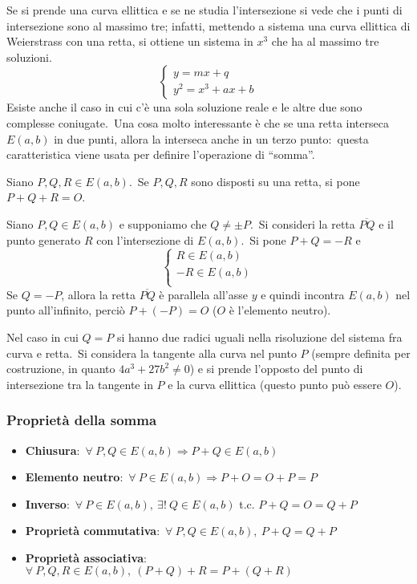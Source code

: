 Se si prende una curva ellittica e se ne studia l'intersezione si vede che i punti di intersezione sono al massimo tre; infatti, mettendo a sistema una curva ellittica di Weierstrass con una retta, si ottiene un sistema in $x^3$ che ha al massimo tre soluzioni.\
\[ \left\{\begin{array}{l}
        y = mx + q \\
        y^2 = x^3 + ax + b
    \end{array}\right.\]
Esiste anche il caso in cui c'è una sola soluzione reale e le altre due sono complesse coniugate.\
Una cosa molto interessante è che se una retta interseca $E(a,b)$ in due punti, allora la interseca anche in un terzo punto:\ questa caratteristica viene usata per definire l'operazione di ``somma''.\

\begin{definition}
    Siano $P, Q, R \in E(a,b)$.\
    Se $P, Q, R$ sono disposti su una retta, si pone $P+Q+R = O$.\
\end{definition}

\noindent Siano $P,Q \in E(a,b)$ e supponiamo che $Q \neq \pm P$.\
Si consideri la retta $\overline{PQ}$ e il punto generato $R$ con l'intersezione di $E(a,b)$.\
Si pone $P+Q = -R$ e
\[\left\{ \begin{array}{l}
        R \in E(a,b)  \\
        -R \in E(a,b) \\
    \end{array}\right.\]
Se $Q = -P$, allora la retta $\overline{PQ}$ è parallela all'asse $y$ e quindi incontra $E(a,b)$ nel punto all'infinito, perciò $P + (-P) = O$ ($O$ è l'elemento neutro).\

Nel caso in cui $Q = P$ si hanno due radici uguali nella risoluzione del sistema fra curva e retta.\
Si considera la tangente alla curva nel punto $P$ (sempre definita per costruzione, in quanto $4a^3 +27b^2 \neq 0$) e si prende l'opposto del punto di intersezione tra la tangente in $P$ e la curva ellittica (questo punto può essere $O$).\

\subsubsection{Proprietà della somma}

\begin{itemize}
    \item \textbf{Chiusura}:\ $\forall\ P,Q \in E(a,b) \Rightarrow P + Q \in E(a,b)$
    \item \textbf{Elemento neutro}:\ $\forall\ P \in E(a,b) \Rightarrow P + O = O + P = P$
    \item \textbf{Inverso}:\ $\forall\ P \in E(a,b),\ \exists !\ Q \in E(a,b)$ t.c. $P + Q = O = Q + P$
    \item \textbf{Proprietà commutativa}:\ $\forall\ P,Q \in E(a,b),\ P + Q = Q + P$
    \item \textbf{Proprietà associativa}:\ $\forall\ P,Q,R \in E(a,b),\ (P + Q) + R = P + (Q + R)$
\end{itemize}

